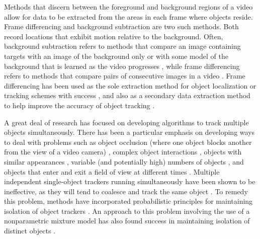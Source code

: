 \documentclass[twocolumn, final]{svjour3}
\begin{document}
Methods that discern between the foreground and background regions of a video allow for data to be extracted from the areas in each frame where objects reside. Frame differencing and background subtraction are two such methods. Both record locations that exhibit motion relative to the background. Often, background subtraction refers to methods that compare an image containing targets with an image of the background only or with some model of the background that is learned as the video progresses \cite{piccardi2004background}, while frame differencing refers to methods that compare pairs of consecutive images in a video \cite{zhang2001segmentation}. Frame differencing has been used as the sole extraction method for object localization or tracking schemes with success \citep{pece_2002, beleznai_2006, chu_2007}, and also as a secondary data extraction method to help improve the accuracy of object tracking \citep{perez_2002}.

A great deal of research has focused on developing algorithms to track multiple objects simultaneously. There has been a particular emphasis on developing ways to deal with problems such as object occlusion (where one object blocks another from the view of a video camera) \cite{senior2006appearance, cucchiara2004probabilistic, zhou2003background}, complex object interactions \cite{khan_2004, mckenna2000tracking, dockstader2001multiple}, objects with similar appearances \cite{maccormick1999probabilistic, jepson_2003}, variable (and potentially high) numbers of objects \cite{reilly2010detection}, and objects that enter and exit a field of view at different times \cite{stauffer2003estimating, nedrich2010learning}. Multiple independent single-object trackers running simultaneously have been shown to be ineffective, as they will tend to coalesce and track the same object \cite{khan_2004}. To remedy this problem, methods have incorporated probabilistic principles for maintaining isolation of object trackers \cite{maccormick1999probabilistic}. An approach to this problem involving the use of a nonparametric mixture model has also found success in maintaining isolation of distinct objects \cite{vermaak_2003}.
\end{document}
